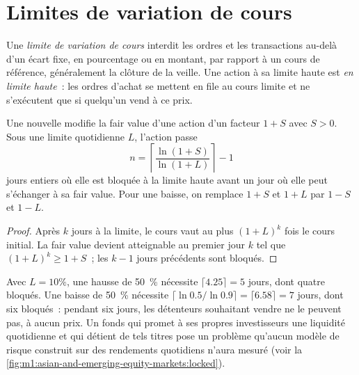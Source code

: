 \section{Limites de variation de cours}

\begin{definition}\label{def:m1:asian-and-emerging-equity-markets:limit}
Une \emph{limite de variation de cours} interdit les ordres et les transactions
au-delà d'un écart fixe, en pourcentage ou en montant, par rapport à un cours de référence,
généralement la clôture de la veille. Une action à sa limite haute est \emph{en limite haute}~:
les ordres d'achat se mettent en file au cours limite et ne s'exécutent que si quelqu'un vend à ce prix.
\end{definition}

\begin{proposition}\label{prop:m1:asian-and-emerging-equity-markets:locked}
Une nouvelle modifie la fair value d'une action d'un facteur $1+S$ avec $S>0$. Sous une
limite quotidienne $L$, l'action passe
\[
n = \left\lceil \frac{\ln(1+S)}{\ln(1+L)} \right\rceil - 1
\]
jours entiers où elle est bloquée à la limite haute avant un jour où elle peut s'échanger
à sa fair value. Pour une baisse, on remplace $1+S$ et $1+L$ par $1-S$ et $1-L$.
\end{proposition}
\begin{proof}
Après $k$ jours à la limite, le cours vaut au plus $(1+L)^k$ fois le cours initial.
La fair value devient atteignable au premier jour $k$ tel que $(1+L)^k \ge 1+S$~;
les $k-1$ jours précédents sont bloqués.
\end{proof}

\begin{example}\label{ex:m1:asian-and-emerging-equity-markets:asym}
Avec $L = 10\%$, une hausse de 50~\% nécessite $\lceil 4.25\rceil = 5$ jours, dont quatre
bloqués. Une baisse de 50~\% nécessite $\lceil \ln 0.5/\ln 0.9\rceil = \lceil
6.58\rceil = 7$ jours, dont six bloqués~: pendant six jours, les détenteurs souhaitant vendre
ne le peuvent pas, à aucun prix. Un fonds qui promet à ses propres investisseurs une liquidité quotidienne
et qui détient de tels titres pose un problème qu'aucun modèle de risque construit sur des
rendements quotidiens n'aura mesuré (voir la \cref{fig:m1:asian-and-emerging-equity-markets:locked}).
\end{example}

